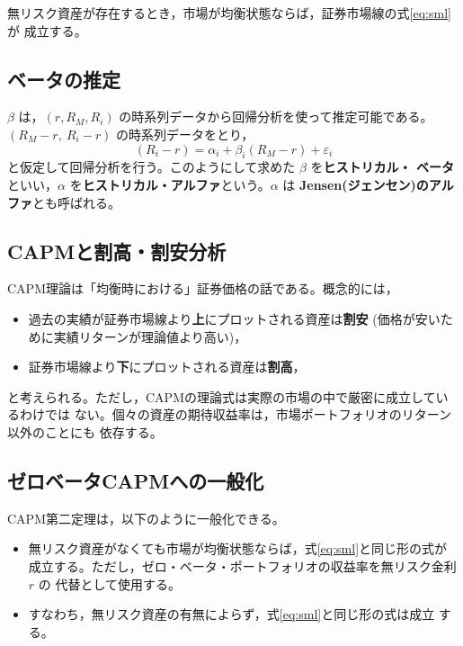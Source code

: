 \begin{theorem}[CAPM第二定理]
無リスク資産が存在するとき，市場が均衡状態ならば，証券市場線の式\eqref{eq:sml}が
成立する。
\end{theorem}

\vspace{18pt}

\subsection{ベータの推定}

$\beta$ は，$(r, R_M, R_i)$ の時系列データから回帰分析を使って推定可能である。
$(R_M - r,\ R_i - r)$ の時系列データをとり，
\begin{equation}
(R_i - r) = \alpha_i + \beta_i(R_M - r) + \varepsilon_i
\end{equation}
と仮定して回帰分析を行う。このようにして求めた $\beta$ を\textbf{ヒストリカル・
ベータ}といい，$\alpha$ を\textbf{ヒストリカル・アルファ}という。$\alpha$ は
\textbf{Jensen(ジェンセン)のアルファ}とも呼ばれる。

\subsection{CAPMと割高・割安分析}

CAPM理論は「均衡時における」証券価格の話である。概念的には，
\begin{itemize}
\item 過去の実績が証券市場線より\textbf{上}にプロットされる資産は\textbf{割安}
(価格が安いために実績リターンが理論値より高い)，
\item 証券市場線より\textbf{下}にプロットされる資産は\textbf{割高}，
\end{itemize}
と考えられる。ただし，CAPMの理論式は実際の市場の中で厳密に成立しているわけでは
ない。個々の資産の期待収益率は，市場ポートフォリオのリターン以外のことにも
依存する。

\subsection{ゼロベータCAPMへの一般化}

CAPM第二定理は，以下のように一般化できる。
\begin{itemize}
\item 無リスク資産がなくても市場が均衡状態ならば，式\eqref{eq:sml}と同じ形の式が
成立する。ただし，ゼロ・ベータ・ポートフォリオの収益率を無リスク金利 $r$ の
代替として使用する。
\item すなわち，無リスク資産の有無によらず，式\eqref{eq:sml}と同じ形の式は成立
する。
\end{itemize}

